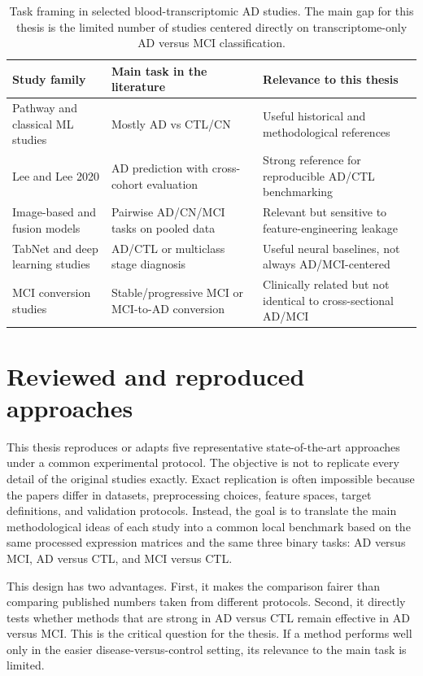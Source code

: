 \begin{table}[htbp]
\centering
\caption{Task framing in selected blood-transcriptomic AD studies. The main gap for this thesis is the limited number of studies centered directly on transcriptome-only AD versus MCI classification.}
\label{tab:literature-task-framing}
\begin{tabular}{p{}p{}p{}}
\hline
Study family & Main task in the literature & Relevance to this thesis \\
\hline
Pathway and classical ML studies & Mostly AD vs CTL/CN & Useful historical and methodological references \\
Lee and Lee 2020 & AD prediction with cross-cohort evaluation & Strong reference for reproducible AD/CTL benchmarking \\
Image-based and fusion models & Pairwise AD/CN/MCI tasks on pooled data & Relevant but sensitive to feature-engineering leakage \\
TabNet and deep learning studies & AD/CTL or multiclass stage diagnosis & Useful neural baselines, not always AD/MCI-centered \\
MCI conversion studies & Stable/progressive MCI or MCI-to-AD conversion & Clinically related but not identical to cross-sectional AD/MCI \\
\hline
\end{tabular}
\end{table}

\section{Reviewed and reproduced approaches}
\label{sec:reviewed-approaches}

This thesis reproduces or adapts five representative state-of-the-art approaches under a common experimental protocol. The objective is not to replicate every detail of the original studies exactly. Exact replication is often impossible because the papers differ in datasets, preprocessing choices, feature spaces, target definitions, and validation protocols. Instead, the goal is to translate the main methodological ideas of each study into a common local benchmark based on the same processed expression matrices and the same three binary tasks: AD versus MCI, AD versus CTL, and MCI versus CTL.

This design has two advantages. First, it makes the comparison fairer than comparing published numbers taken from different protocols. Second, it directly tests whether methods that are strong in AD versus CTL remain effective in AD versus MCI. This is the critical question for the thesis. If a method performs well only in the easier disease-versus-control setting, its relevance to the main task is limited.

